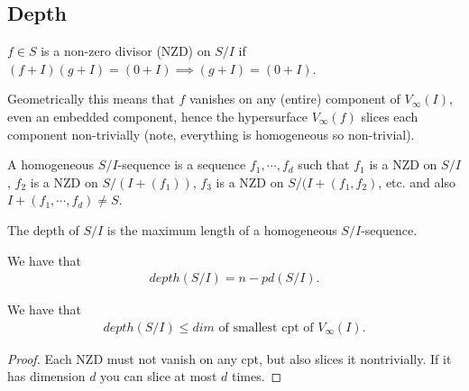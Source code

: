 \subsection{Depth}

\begin{definition}
    $f \in S$ is a non-zero divisor (NZD) on $S / I $ if $(f+I ) (g+ I ) = (0+I) \implies (g+I ) = (0+I)$.
\end{definition}

Geometrically this means that $f$ vanishes on any (entire) component of $V_\infty (I)$, even an embedded component, hence the hypersurface $V_\infty (f)$ slices each component non-trivially (note, everything is homogeneous so non-trivial).

\begin{definition}
    A homogeneous $S/I$-sequence is a sequence $f_1 , \cdots, f_d$ such that $f_1$ is a NZD on $S/I$, $f_2$ is a NZD on $S/(I + (f_1) )$, $f_3$ is a NZD on $S/ (I + (f_1,f_2) $, etc. and also $I + (f_1, \cdots , f_d) \neq S$.
\end{definition}

\begin{definition}
    The depth of $S/I$ is the maximum length of a homogeneous $S/I$-sequence.
\end{definition}

\begin{theorem} We have that
\begin{align*}
    depth(S/I ) = n - pd(S/I).
\end{align*}
\end{theorem}

\begin{corollary}
    We have that
    \begin{align*}
        depth(S/I) \leq dim \text{ of smallest cpt of } V_\infty (I).
    \end{align*}
\end{corollary}

\begin{proof}
    Each NZD must not vanish on any cpt, but also slices it nontrivially. If it has dimension $d$ you can slice at most $d$ times.
\end{proof}

